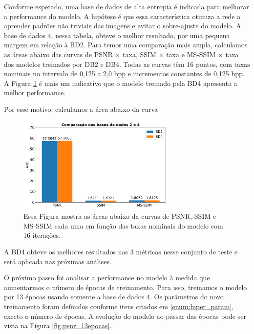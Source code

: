 Conforme esperado, uma base de dados de alta entropia é indicada para melhorar a performance do modelo. A hipótese é que essa característica otimiza a rede a aprender padrões não triviais das imagens e evitar o sobre-ajuste do modelo. A base de dados 4, nessa tabela, obteve o melhor resultado, por uma pequena margem em relação à BD2. 
Para temos uma comparação mais ampla, calculamos as áreas abaixo das curvas de PSNR $\times$ taxa, SSIM $\times$ taxa e  MS-SSIM $\times$ taxa dos modelos treinados por DB2 e DB4. Todas  as curvas têm 16 pontos, com taxas nominais no intervalo de 0,125 a 2,0 bpp e incrementos constantes de 0,125 bpp. A Figura \ref{fig:auc1} é mais um indicativo que o modelo treinado pela BD4 apresenta a melhor performance.    


Por esse motivo, calculamos a área abaixo da curva   

\begin{figure}
	\centering
	\includegraphics[width=0.7\textwidth]{figuras/auc1.pdf}
	\caption[Comparação das bases de dados pela área abaixo das curvas em métricas de qualidade]{Essa Figura mostra as áreas abaixo da curvas de PSNR, SSIM e MS-SSIM cada uma em função das taxas nominais do modelo com 16 iterações.}
	\label{fig:auc1}
\end{figure}

A BD4 obteve os melhores resultados nas 3 métricas nesse conjunto de teste e será aplicada nas próximas análises.

O próximo passo foi analisar a performance no modelo à medida que aumentarmos o número de épocas de treinamento.
Para isso, treinamos o modelo por 13 épocas usando somente a base de dados 4. Os parâmetros do novo treinamento foram definidos conforme itens citados em \ref{enum:hiper_param}, exceto o número de épocas. A evolução do modelo ao passar das épocas pode ser vista na Figura \ref{fig:psnr_13epocas}. 

